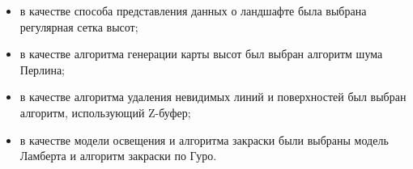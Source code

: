\begin{itemize}[label*=--]
	\item в качестве способа представления данных о ландшафте была выбрана регулярная сетка высот;
	\item в качестве алгоритма генерации карты высот был выбран алгоритм шума Перлина;

\clearpage

	\item в качестве алгоритма удаления невидимых линий и поверхностей был выбран алгоритм, использующий Z-буфер;
	\item в качестве модели освещения и алгоритма закраски были выбраны модель Ламберта и алгоритм закраски по Гуро.
\end{itemize}


                                                                                                                                                                                                     